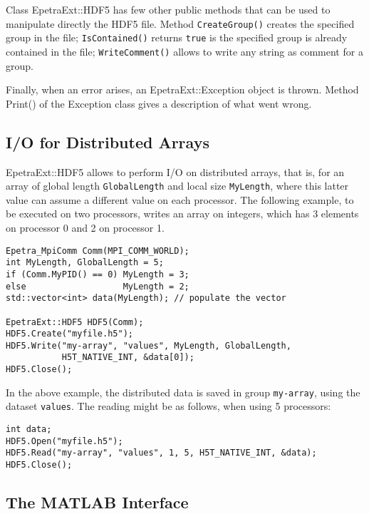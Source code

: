 \documentclass[11pt,relax]{SANDreport}
\begin{document}
Class EpetraExt::HDF5 has few other public methods that can be used to
manipulate directly the HDF5 file. Method
{\tt CreateGroup()} creates the specified group in the file;
{\tt IsContained()} returns {\tt true} is the specified group is already
contained in the file;
{\tt WriteComment()} allows to write any string as comment for a group.

Finally, when an error arises, an EpetraExt::Exception object is
thrown. Method Print() of the Exception class gives a description of
what went wrong.

\subsection{I/O for Distributed Arrays}
\label{sec:hdf5:arrays}

EpetraExt::HDF5 allows to perform I/O on distributed arrays, that is, for an
array of global length {\tt GlobalLength} and local size {\tt MyLength}, where
this latter value can assume a different value on each processor. The
following example, to be executed on two processors, writes an array on
integers, which has 3 elements on processor 0 and 2 on processor 1.
\begin{verbatim}
Epetra_MpiComm Comm(MPI_COMM_WORLD);
int MyLength, GlobalLength = 5;
if (Comm.MyPID() == 0) MyLength = 3;
else                   MyLength = 2;
std::vector<int> data(MyLength); // populate the vector

EpetraExt::HDF5 HDF5(Comm);
HDF5.Create("myfile.h5");
HDF5.Write("my-array", "values", MyLength, GlobalLength,
           H5T_NATIVE_INT, &data[0]);
HDF5.Close();
\end{verbatim}
In the above example, the distributed data is saved in group {\tt my-array},
   using the dataset {\tt values}. The reading might be as follows, when using
   5 processors:
\begin{verbatim}
int data;
HDF5.Open("myfile.h5");
HDF5.Read("my-array", "values", 1, 5, H5T_NATIVE_INT, &data);
HDF5.Close();
\end{verbatim}

\subsection{The MATLAB Interface}
\label{sec:hdf5:matlab}
\end{document}
